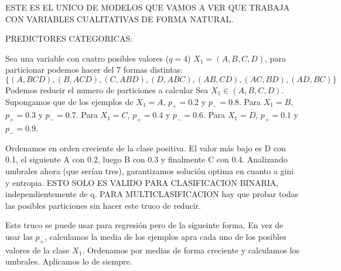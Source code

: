 ESTE ES EL UNICO DE MODELOS QUE VAMOS A VER QUE TRABAJA CON VARIABLES CUALITATIVAS DE FORMA NATURAL.

PREDICTORES CATEGORICAS: 
\begin{example}
Sea una variable con cuatro posibles valores ($q = 4$) $X_1 = (A, B, C, D)$, para particionar podemos hacer del 7 formas distintas: 
\begin{equation}
\{(A, BCD), (B, ACD), (C, ABD), (D, ABC), (AB, CD), (AC, BD), (AD, BC)\}
\end{equation}
Podemos reducir el numero de particiones a calcular 
Sea $X_1 \in (A, B, C, D)$. Supongamos que de los ejemplos de $X_1 = A$, $p_+ = 0.2$ y $p_- = 0.8$. Para $X_1 = B$, $p_+ = 0.3$ y $p_- = 0.7$. Para $X_1 = C$, $p_+ = 0.4$ y $p_- = 0.6$. Para $X_1 = D$, $p_+ = 0.1$ y $p_- = 0.9$. 

Ordenamos en orden creciente de la clase positiva. El valor más bajo es D con 0.1, el siguiente A con 0.2, luego B con 0.3 y finalmente C con 0.4. Analizando umbrales ahora (que serían tres), garantizamos solución optima en cuanto a gini y entropia. ESTO SOLO ES VALIDO PARA CLASIFICACION BINARIA, independientemente de q. PARA MULTICLASIFICACION hay que probar todas las posibles particiones sin hacer este truco de reducir.
\end{example}

Este truco se puede usar para regresión pero de la sigueinte forma. En vez de usar las $p_+$, calculamos la media de los ejemplos apra cada uno de los posibles valores de la clase $X_1$. Ordenamos por medias de forma creciente y calculamos los umbrales. Aplicamos lo de siempre.



